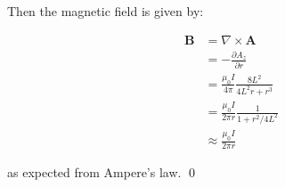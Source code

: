 \documentclass[12pt]{article}
\begin{document}
Then the magnetic field is given by:

\begin{equation}
\begin{split}
    \mathbf{B} &= \nabla \times \mathbf{A} \\
    &= -\frac{\partial A_{z}}{\partial r} \\
    &= \frac{\mu_{0} I}{4\pi} \frac{8L^{2}}{4L^{2}r + r^{3}} \\
    &= \frac{\mu_{0} I}{2\pi r} \frac{1}{1 + r^{2}/4L^{2}} \\
    &\approx \frac{\mu_{0} I}{2\pi r}
\end{split}
\end{equation}

as expected from Ampere's law.
\qed
\end{document}
